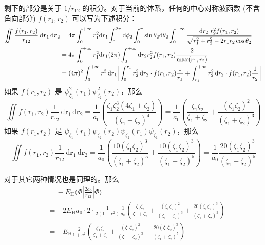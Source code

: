 剩下的部分是关于 $1/r_{12}$ 的积分。对于当前的体系，任何的中心对称波函数 (不含角向部分) $f(r_1, r_2)$ 可以写为下述积分：
\begin{align*}
    \iint  \frac{f(r_1, r_2)}{r_{12}} \, \mathrm{d} \bm{r}_1 \, \mathrm{d} \bm{r}_2 
    &= 4\pi \int_0^{+\infty} r_1^2 \mathrm{d} r_1 \int_0^{2\pi} \mathrm{d}\phi_2 \int_0^\pi \sin\theta_2 \mathrm{d}\theta_2 \int_0^{+\infty}   \dfrac{\mathrm{d} r_2 \;r_2^2 f(r_1, r_2) }{\sqrt{r_1^2 + r_2^2 - 2r_1 r_2\cos\theta_2}} \notag\\
    &= 4\pi \int_0^{+\infty} r_1^2 \mathrm{d} r_1  (2\pi)  \int_0^{+\infty}  \mathrm{d} r_2 r_2^2 f(r_1, r_2) \dfrac{2}{\max(r_1,r_2)} \notag\\
    &= (4 \pi)^2 \int_0^{+\infty} r_1^2 \, \mathrm{d} r_1 
    \qty[\int_0^{r_1} r_2^2 \, \mathrm{d} r_2 \cdot f(r_1, r_2) \frac{1}{r_1}
    + \int_{r_1}^{+\infty} r_2^2 \, \mathrm{d} r_2 \cdot f(r_1, r_2) \frac{1}{r_2}]
\end{align*}
如果 $f(r_1, r_2)$ 是 $\psi_{\zeta_1}^2 (r_1) \psi_{\zeta_2}^2 (r_2)$，那么
\begin{equation*}
    \iint f(r_1, r_2) \frac{1}{r_{12}} \, \mathrm{d} \bm{r}_1 \, \mathrm{d} \bm{r}_2
    = \frac{1}{a_0} \left( \frac{\zeta_1 \zeta_2^3 (4 \zeta_1 + \zeta_2)}{(\zeta_1 + \zeta_2)^4} \right)
    = \frac{1}{a_0} \left( \frac{\zeta_1 \zeta_2}{\zeta_1 + \zeta_2} + \frac{(\zeta_1 \zeta_2)^2}{(\zeta_1 + \zeta_2)^3} \right)
\end{equation*}
如果 $f(r_1, r_2)$ 是 $\psi_{\zeta_1} (r_1) \psi_{\zeta_2} (r_2) \psi_{\zeta_2} (r_1) \psi_{\zeta_1} (r_2)$，那么
\begin{equation*}
    \iint f(r_1, r_2) \frac{1}{r_{12}} \, \mathrm{d} \bm{r}_1 \, \mathrm{d} \bm{r}_2
    = \frac{1}{a_0} \left( \frac{10 (\zeta_1 \zeta_2)^3}{(\zeta_1 + \zeta_2)^5} + \frac{10 (\zeta_1 \zeta_2)^3}{(\zeta_1 + \zeta_2)^5} \right)
    = \frac{1}{a_0} \frac{20 (\zeta_1 \zeta_2)^3}{(\zeta_1 + \zeta_2)^5}
\end{equation*}





对于其它两种情况也是同理的。那么%
\begin{align*}
    &\quad\ - E_\mathrm{H} \langle \Phi | \frac{2 a_0}{r_{12}} | \Phi \rangle \\
    &= - 2 E_\mathrm{H} a_0 \cdot 2 \cdot \frac{1}{2 (1 + c^2)} \frac{1}{a_0} \left( \frac{\zeta_1 \zeta_2}{\zeta_1 + \zeta_2} + \frac{(\zeta_1 \zeta_2)^2}{(\zeta_1 + \zeta_2)^3} + \frac{20 (\zeta_1 \zeta_2)^3}{(\zeta_1 + \zeta_2)^5} \right) \\
    &= - E_\mathrm{H} \frac{2}{1 + c^2} \left( \frac{\zeta_1 \zeta_2}{\zeta_1 + \zeta_2} + \frac{(\zeta_1 \zeta_2)^2}{(\zeta_1 + \zeta_2)^3} + \frac{20 (\zeta_1 \zeta_2)^3}{(\zeta_1 + \zeta_2)^5} \right)
\end{align*}




